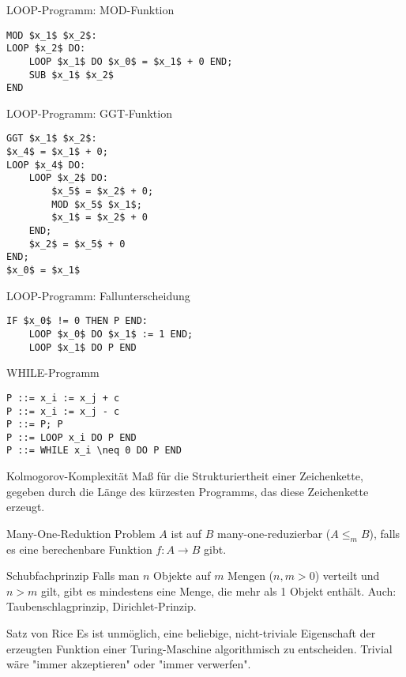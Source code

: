 \documentclass[a7paper,print,grid=both]{kartei}
\begin{document}
\begin{karte}{LOOP-Programm: MOD-Funktion}
\begin{lstlisting}[mathescape=true]
MOD $x_1$ $x_2$:
LOOP $x_2$ DO:
    LOOP $x_1$ DO $x_0$ = $x_1$ + 0 END;
    SUB $x_1$ $x_2$
END
\end{lstlisting}
\end{karte}
\begin{karte}{LOOP-Programm: GGT-Funktion}
\begin{lstlisting}[mathescape=true]
GGT $x_1$ $x_2$:
$x_4$ = $x_1$ + 0;
LOOP $x_4$ DO:
    LOOP $x_2$ DO:
        $x_5$ = $x_2$ + 0;
        MOD $x_5$ $x_1$;
        $x_1$ = $x_2$ + 0
    END;
    $x_2$ = $x_5$ + 0
END;
$x_0$ = $x_1$
\end{lstlisting}
\end{karte}
\begin{karte}{LOOP-Programm: Fallunterscheidung}
\begin{lstlisting}[mathescape=true]
IF $x_0$ != 0 THEN P END:
    LOOP $x_0$ DO $x_1$ := 1 END;
    LOOP $x_1$ DO P END
\end{lstlisting}
\end{karte}
\begin{karte}{WHILE-Programm}
\begin{lstlisting}[mathescape=true]
P ::= x_i := x_j + c
P ::= x_i := x_j - c
P ::= P; P
P ::= LOOP x_i DO P END
P ::= WHILE x_i \neq 0 DO P END
\end{lstlisting}
\end{karte}
\begin{karte}{Kolmogorov-Komplexität}
Maß für die Strukturiertheit einer Zeichenkette, gegeben durch die Länge des kürzesten Programms, das diese Zeichenkette erzeugt.
\end{karte}
\begin{karte}{Many-One-Reduktion}
Problem $A$ ist auf $B$ many-one-reduzierbar ($A \leq_m B$), falls es eine berechenbare Funktion $f:A\rightarrow B$ gibt.
\end{karte}
\begin{karte}{Schubfachprinzip}
Falls man $n$ Objekte auf $m$ Mengen ($n,m>0$) verteilt und $n>m$ gilt, gibt es mindestens eine Menge, die mehr als 1 Objekt enthält. Auch: Taubenschlagprinzip, Dirichlet-Prinzip.
\end{karte}
\begin{karte}{Satz von Rice}
Es ist unmöglich, eine beliebige, nicht-triviale Eigenschaft der erzeugten Funktion einer Turing-Maschine algorithmisch zu entscheiden. Trivial wäre "immer akzeptieren" oder "immer verwerfen".
\end{karte}
\end{document}
